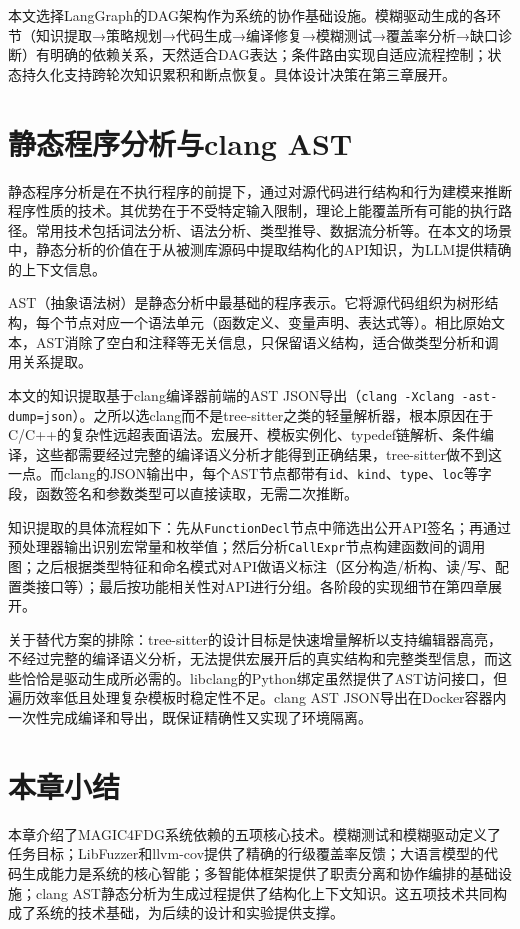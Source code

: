 本文选择LangGraph的DAG架构作为系统的协作基础设施。模糊驱动生成的各环节（知识提取→策略规划→代码生成→编译修复→模糊测试→覆盖率分析→缺口诊断）有明确的依赖关系，天然适合DAG表达；条件路由实现自适应流程控制；状态持久化支持跨轮次知识累积和断点恢复。具体设计决策在第三章展开。

\section{静态程序分析与clang AST}

静态程序分析是在不执行程序的前提下，通过对源代码进行结构和行为建模来推断程序性质的技术\cite{Nielson1999}。其优势在于不受特定输入限制，理论上能覆盖所有可能的执行路径。常用技术包括词法分析、语法分析、类型推导、数据流分析等\cite{Bessey2010}。在本文的场景中，静态分析的价值在于从被测库源码中提取结构化的API知识，为LLM提供精确的上下文信息。

AST（抽象语法树）是静态分析中最基础的程序表示\cite{Duffy2014}。它将源代码组织为树形结构，每个节点对应一个语法单元（函数定义、变量声明、表达式等）。相比原始文本，AST消除了空白和注释等无关信息，只保留语义结构，适合做类型分析和调用关系提取。

本文的知识提取基于clang编译器前端的AST JSON导出（\texttt{clang -Xclang -ast-dump=json}）。之所以选clang而不是tree-sitter之类的轻量解析器，根本原因在于C/C++的复杂性远超表面语法。宏展开、模板实例化、typedef链解析、条件编译，这些都需要经过完整的编译语义分析才能得到正确结果，tree-sitter做不到这一点。而clang的JSON输出中，每个AST节点都带有\texttt{id}、\texttt{kind}、\texttt{type}、\texttt{loc}等字段，函数签名和参数类型可以直接读取，无需二次推断。

知识提取的具体流程如下：先从\texttt{FunctionDecl}节点中筛选出公开API签名；再通过预处理器输出识别宏常量和枚举值；然后分析\texttt{CallExpr}节点构建函数间的调用图；之后根据类型特征和命名模式对API做语义标注（区分构造/析构、读/写、配置类接口等）；最后按功能相关性对API进行分组。各阶段的实现细节在第四章展开。

关于替代方案的排除：tree-sitter的设计目标是快速增量解析以支持编辑器高亮，不经过完整的编译语义分析，无法提供宏展开后的真实结构和完整类型信息，而这些恰恰是驱动生成所必需的。libclang的Python绑定虽然提供了AST访问接口，但遍历效率低且处理复杂模板时稳定性不足。clang AST JSON导出在Docker容器内一次性完成编译和导出，既保证精确性又实现了环境隔离。

\section{本章小结}

本章介绍了MAGIC4FDG系统依赖的五项核心技术。模糊测试和模糊驱动定义了任务目标；LibFuzzer和llvm-cov提供了精确的行级覆盖率反馈；大语言模型的代码生成能力是系统的核心智能；多智能体框架提供了职责分离和协作编排的基础设施；clang AST静态分析为生成过程提供了结构化上下文知识。这五项技术共同构成了系统的技术基础，为后续的设计和实验提供支撑。